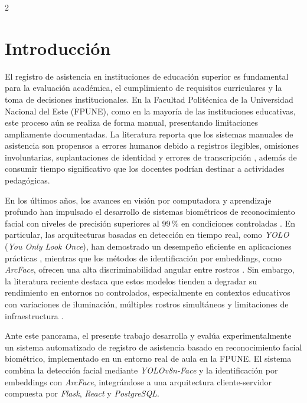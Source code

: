 \documentclass[10pt,a4paper]{article}
\begin{document}
\begin{multicols}{2}
\thispagestyle{empty}

\section{Introducción}

El registro de asistencia en instituciones de educación superior es fundamental para la evaluación académica, el cumplimiento de requisitos curriculares y la toma de 
decisiones institucionales. En la Facultad Politécnica de la Universidad Nacional del Este (FPUNE), como en la mayoría de las instituciones educativas, este proceso aún se realiza de forma manual, presentando limitaciones ampliamente documentadas. La literatura reporta que los sistemas manuales de asistencia son propensos a errores humanos debido a registros ilegibles, omisiones involuntarias, suplantaciones de identidad y errores de transcripción \cite{attendanceManagement,registroAsistenciaUTA,prototipoUNIANDES}, además de consumir tiempo significativo que los docentes podrían destinar a actividades pedagógicas.


En los últimos años, los avances en visión por computadora y aprendizaje profundo han impulsado el desarrollo de sistemas biométricos de reconocimiento facial con niveles de precisión superiores al 99\,\% en condiciones controladas \cite{reconocimientoVeridas,facialAWS}. En particular, las arquitecturas basadas en detección en tiempo real, como \textit{YOLO} (\textit{You Only Look Once}), han demostrado un desempeño eficiente en aplicaciones prácticas \cite{yolo,fatima2024yolov8}, mientras que los métodos de identificación por embeddings, como \textit{ArcFace}, ofrecen una alta discriminabilidad angular entre rostros \cite{arcface}. Sin embargo, la literatura reciente destaca que estos modelos tienden a degradar su rendimiento en entornos no controlados, especialmente en contextos educativos con variaciones de iluminación, múltiples rostros simultáneos y limitaciones de infraestructura \cite{sistemaBiometricoRaspberry,detecFacialOpenCV}.

Ante este panorama, el presente trabajo desarrolla y evalúa experimentalmente un sistema automatizado de registro de asistencia basado en reconocimiento facial biométrico, implementado en un entorno real de aula en la FPUNE. El sistema combina la detección facial mediante \textit{YOLOv8n-Face} y la identificación por embeddings con \textit{ArcFace}, integrándose a una arquitectura cliente-servidor compuesta por \textit{Flask}, \textit{React} y \textit{PostgreSQL}. 


\end{multicols}
\end{document}
